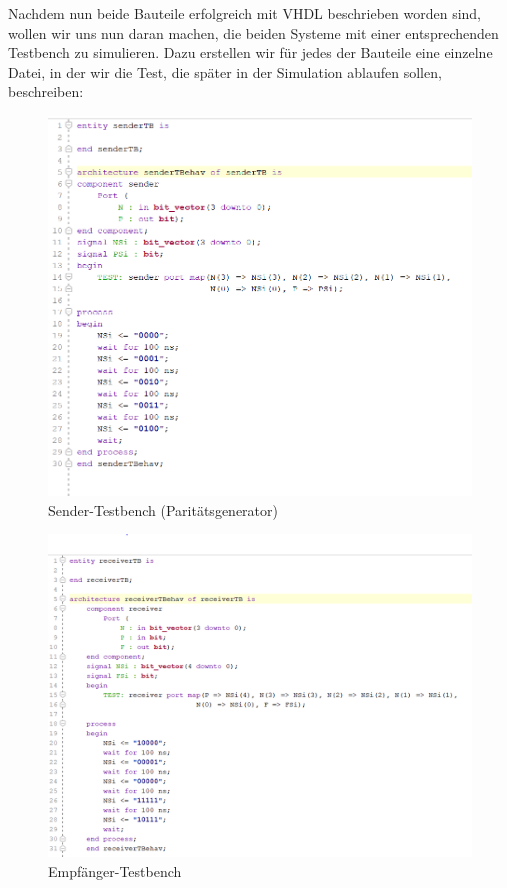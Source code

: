 \documentclass{article}
\begin{document}
Nachdem nun beide Bauteile erfolgreich mit VHDL beschrieben worden sind, wollen wir uns nun daran machen, die beiden Systeme mit einer entsprechenden Testbench zu simulieren. Dazu erstellen wir für jedes der Bauteile eine einzelne Datei, in der wir die Test, die später in der Simulation ablaufen sollen, beschreiben:

\begin{figure}[h]
  \centering
  \includegraphics[width=\textwidth]{../assets/images/DI1/senderTB.PNG}
  \caption{Sender-Testbench (Paritätsgenerator)}
  \label{fig:vhdTB1}
\end{figure}

\begin{figure}[h]
  \centering
  \includegraphics[width=\textwidth]{../assets/images/DI1/receiverTB.PNG}
  \caption{Empfänger-Testbench}
  \label{fig:vhdTB2}
\end{figure}
\newpage
\end{document}
